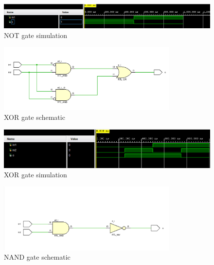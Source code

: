 \documentclass[pdftex,12pt,a4paper]{article}
\begin{document}
    \begin{figure}[H]
    	\centering
    	\includegraphics[width=1\textwidth]{simulations/not_sim.png}	
    	\caption{NOT gate simulation}
    	\label{NOT gate simulation}
    \end{figure}
    
    \begin{figure}[H]
    	\centering
    	\includegraphics[width=0.8\textwidth]{schematic/xor_schematic.png}	
    	\caption{XOR gate schematic}
    	\label{XOR gate schematic}
    \end{figure}
    
    \begin{figure}[H]
    	\centering
    	\includegraphics[width=1\textwidth]{simulations/xor_sim.png}	
    	\caption{XOR gate simulation}
    	\label{XOR gate simulation}
    \end{figure}
    
    \begin{figure}[H]
    	\centering
    	\includegraphics[width=0.8\textwidth]{schematic/nand_schematic.png}	
    	\caption{NAND gate schematic}
    	\label{NAND gate schematic}
    \end{figure}
    
\end{document}
